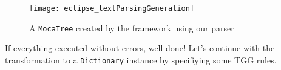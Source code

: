 \vspace{0.5cm}

\begin{figure}[!htbp]
\begin{center}
 \texttt{[image: eclipse\_textParsingGeneration]}
  \caption{A \texttt{MocaTree} created by the framework using our parser}
  \label{eclipse:treeResult}
\end{center}
\end{figure}

If everything executed without errors, well done! Let's continue with the transformation to a \texttt{Dictionary} instance by specifiying some
TGG rules.
